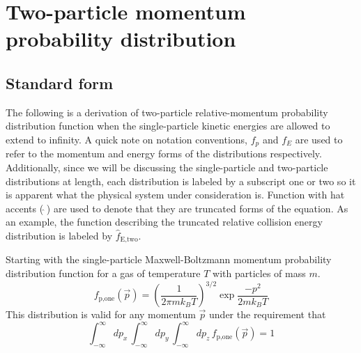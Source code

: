 \chapter{Two-particle momentum probability distribution} \label{app:momDistDer}
\section{Standard form} \label{sec:standardDist}
The following is a derivation of two-particle relative-momentum probability distribution function when the single-particle kinetic energies are allowed to extend to infinity.
A quick note on notation conventions, $f_p$ and $f_E$ are used to refer to the momentum and energy forms of the distributions respectively.
Additionally, since we will be discussing the single-particle and two-particle distributions at length, each distribution is labeled by a subscript one or two so it is apparent what the physical system under consideration is.
Function with hat accents ($\,\hat{ }\,$) are used to denote that they are truncated forms of the equation.
As an example, the function describing the truncated relative collision energy distribution is labeled by $\hat{f}_\text{E,two}$.

Starting with the single-particle Maxwell-Boltzmann momentum probability distribution function for a gas of temperature $T$ with particles of mass $m$.
\begin{equation} 
\label{eq:single_particle_prob}
		 f_\text{p,one}( \vec{p} ) = \left(\frac{1}{2 \pi m k_B T}\right)^{3/2} \exp{ \frac{-p^2}{2 m k_B T} }
\end{equation}
This distribution is valid for any momentum $\vec{p}$ under the requirement that 
\begin{equation}
	\int_{-\infty}^\infty dp_x \,\int_{-\infty}^\infty dp_y \,\int_{-\infty}^\infty dp_z \, f_\text{p,one}( \vec{p} ) = 1
\end{equation}

